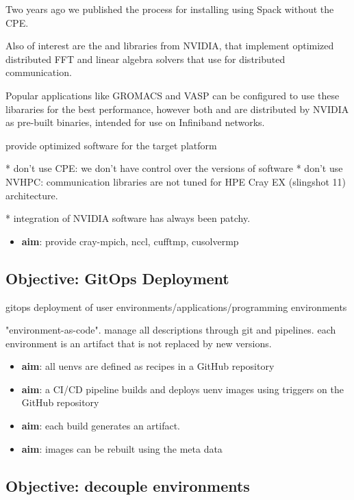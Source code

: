 Two years ago we published the process for installing \craympich using Spack without the CPE.

Also of interest are the \cufftmp and \cusolvermp libraries from NVIDIA, that implement optimized distributed FFT and linear algebra solvers that use \nvshmem for distributed communication.

Popular applications like GROMACS and VASP can be configured to use these libararies for the best performance, however both \cufftmp and \cusolvermp are distributed by NVIDIA as pre-built binaries, intended for use on Infiniband networks.

provide optimized software for the target platform

    * don't use CPE: we don't have control over the versions of software
    * don't use NVHPC: communication libraries are not tuned for HPE Cray EX (slingshot 11) architecture.

    * integration of NVIDIA software has always been patchy.

\begin{itemize}
    \item \textbf{aim}: provide cray-mpich, nccl, cufftmp, cusolvermp
\end{itemize}
\subsection{Objective: GitOps Deployment}

gitops deployment of user environments/applications/programming environments

"environment-as-code".
manage all descriptions through git and pipelines.
each environment is an artifact that is not replaced by new versions.

\begin{itemize}
    \item \textbf{aim}: all uenvs are defined as recipes in a GitHub repository
    \item \textbf{aim}: a CI/CD pipeline builds and deploys uenv images using triggers on the GitHub repository
    \item \textbf{aim}: each build generates an artifact.
    \item \textbf{aim}: images can be rebuilt using the meta data
\end{itemize}

\subsection{Objective: decouple environments}

